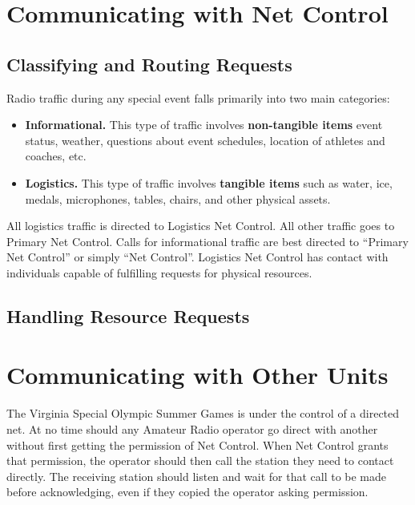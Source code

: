 \documentclass[pdflatex,letterpaper,twoside,12pt]{book}
\begin{document}
\section{Communicating with Net Control}

\subsection{Classifying and Routing Requests}

Radio traffic during any special event falls primarily into two main categories:

\begin{itemize}
	\item \textbf{Informational.}  This type of traffic involves \textbf{non-tangible items} event status, weather, questions about event schedules, location of athletes and coaches, etc.
	\item \textbf{Logistics.}  This type of traffic involves \textbf{tangible items} such as water, ice, medals, microphones, tables, chairs, and other physical assets.  
\end{itemize}

All logistics traffic is directed to Logistics Net Control.  All other traffic goes to Primary Net Control.  Calls for informational traffic are best directed to ``Primary Net Control'' or simply ``Net Control''.  Logistics Net Control has contact with individuals capable of fulfilling requests for physical resources.


\subsection{Handling Resource Requests}


\section{Communicating with Other Units}

The Virginia Special Olympic Summer Games is under the control of a directed net. At no time should any Amateur Radio operator go direct with another without first getting the permission of Net Control. When Net Control grants that permission, the operator should then call the station they need to contact directly. The receiving station should listen and wait for that call to be made before acknowledging, even if they copied the operator asking permission.
\end{document}
